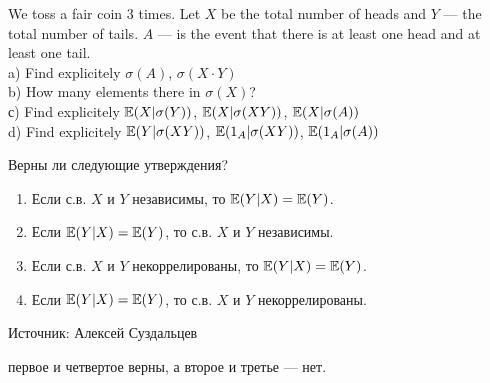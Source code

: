\begin{problem}
We toss a fair coin 3 times. Let $X$ be the total number of heads and $Y$ --- the total number of tails. $A$ --- is the event that there is at least one head and at least one tail. \\
a) Find explicitely $\sigma(A)$, $\sigma(X\cdot Y)$ \\
b) How many elements there in $\sigma(X)$? \\
с) Find explicitely $\mathbb{E}(X|\sigma(Y))$, $\mathbb{E}(X|\sigma(XY))$, $\mathbb{E}(X|\sigma(A))$ \\
d) Find explicitely $\mathbb{E}(Y|\sigma(XY))$, $\mathbb{E}(1_{A}|\sigma(XY))$, $\mathbb{E}(1_{A}|\sigma(A))$ 
\end{problem} 
\begin{solution} 

\end{solution}

\begin{problem}
Верны ли следующие утверждения?
\begin{enumerate}
  \item Если с.в. $X$ и $Y$ независимы, то $\mathbb{E}(Y|X)=\mathbb{E}(Y)$.
  \item Если $\mathbb{E}(Y|X)=\mathbb{E}(Y)$, то с.в. $X$ и $Y$ независимы.
  \item Если с.в. $X$ и $Y$ некоррелированы, то $\mathbb{E}(Y|X)=\mathbb{E}(Y)$.
  \item Если $\mathbb{E}(Y|X)=\mathbb{E}(Y)$, то с.в. $X$ и $Y$ некоррелированы.
\end{enumerate}

Источник: Алексей Суздальцев
\end{problem} 
\begin{solution} 
 первое и четвертое верны, а второе и третье --- нет.
\end{solution}

